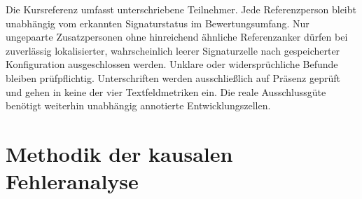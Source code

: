 Die Kursreferenz umfasst unterschriebene Teilnehmer. Jede Referenzperson bleibt unabhängig vom erkannten Signaturstatus im Bewertungsumfang. Nur ungepaarte Zusatzpersonen ohne hinreichend ähnliche Referenzanker dürfen bei zuverlässig lokalisierter, wahrscheinlich leerer Signaturzelle nach gespeicherter Konfiguration ausgeschlossen werden. Unklare oder widersprüchliche Befunde bleiben prüfpflichtig. Unterschriften werden ausschließlich auf Präsenz geprüft und gehen in keine der vier Textfeldmetriken ein. Die reale Ausschlussgüte benötigt weiterhin unabhängig annotierte Entwicklungszellen.

\section{Methodik der kausalen Fehleranalyse}
\label{sec:methodik-fehleranalyse}

